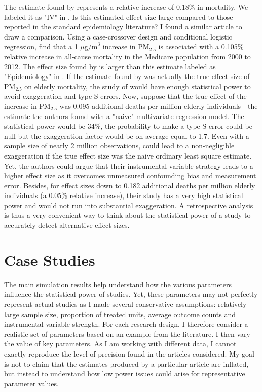 \documentclass[12pt]{article}
\begin{document}
    The estimate found by \cite{deryugina_mortality_2019} represents a relative increase of 0.18\% in mortality. We labeled it as "IV" in . Is this estimated effect size large compared to those reported in the standard epidemiology literature? I found a similar article to draw a comparison. Using a case-crossover design and conditional logistic regression, \cite{di_association_2017} find that a 1 $\mu \text{g/m}^3$ increase in PM$_{2.5}$ is associated with a 0.105\% relative increase in all-cause mortality in the Medicare population from 2000 to 2012. The effect size found by \cite{deryugina_mortality_2019} is larger than this estimate labeled as "Epidemiology" in . If the estimate found by \cite{di_association_2017} was actually the true effect size of PM$_{2.5}$ on elderly mortality, the study of \cite{deryugina_mortality_2019} would have enough statistical power to avoid exaggeration and type S errors. Now, suppose that the true effect of the increase in PM$_{2.5}$ was 0.095 additional deaths per million elderly individuals---the estimate the authors found with a "naive" multivariate regression model. The statistical power would be 34\%, the probability to make a type S error could be null but the exaggeration factor would be on average equal to 1.7. Even with a sample size of nearly 2 million observations, \cite{deryugina_mortality_2019} could lead to a non-negligible exaggeration if the true effect size was the naive ordinary least square estimate. Yet, the authors could argue that their instrumental variable strategy leads to a higher effect size as it overcomes unmeasured confounding bias and measurement error. Besides, for effect sizes down to 0.182 additional deaths per million elderly individuals (a 0.05\% relative increase), their study has a very high statistical power and would not run into substantial exaggeration. A retrospective analysis is thus a very convenient way to think about the statistical power of a study to accurately detect alternative effect sizes.

    \section{Case Studies}  \label{case_studies}

        The main simulation results help understand how the various parameters influence the statistical power of studies. Yet, these parameters may not perfectly represent actual studies as I made several conservative assumptions: relatively large sample size, proportion of treated units, average outcome counts and instrumental variable strength. For each research design, I therefore consider a realistic set of parameters based on an example from the literature. I then vary the value of key parameters. As I am working with different data, I cannot exactly reproduce the level of precision found in the articles considered. My goal is not to claim that the estimates produced by a particular article are inflated, but instead to understand how low power issues could arise for representative parameter values.
            
\end{document}
